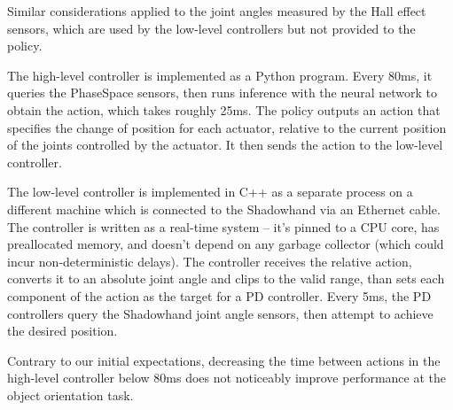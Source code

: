 Similar considerations applied to the joint angles measured by the Hall effect sensors, which are used by the low-level controllers but not provided to the policy.



The high-level controller is implemented as a Python program. Every 80ms, it queries the PhaseSpace sensors, then runs inference with the neural network to obtain the action, which takes roughly 25ms. The policy outputs an action that specifies the change of position for each actuator, relative to the current position of the joints controlled by the actuator. It then sends the action to the low-level controller.

The low-level controller is implemented in C++ as a separate process on a different machine which is 
connected to the Shadowhand via an Ethernet cable. The controller is written as a real-time system 
-- it's pinned to a CPU core, has preallocated memory, and doesn't depend on any garbage collector (which could incur non-deterministic delays).
The controller receives the relative action, converts it to 
an absolute joint angle and clips to the valid range, than sets each component of the action as the target for a PD controller. Every 5ms, the PD controllers query the Shadowhand joint angle sensors, then attempt to achieve the desired position.


Contrary to our initial expectations, decreasing the time between actions in the high-level controller below 80ms does not noticeably improve performance at the object orientation task.

